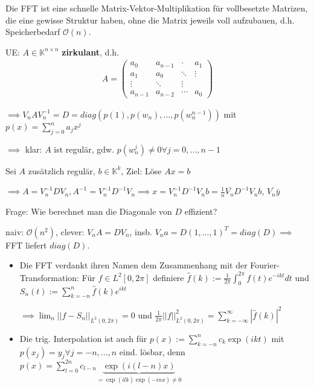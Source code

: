 \begin{remark}
	Die FFT ist eine schnelle Matrix-Vektor-Multiplikation für vollbesetzte Matrizen, die eine gewisse Struktur haben, ohne die Matrix jeweils voll aufzubauen, d.h. Speicherbedarf $\mathcal{O}(n)$.
\end{remark}

UE: $A \in \mathbb{K}^{n \times n}$ \textbf{zirkulant}, d.h.
\begin{align*}
	A = \left(\begin{matrix}
		a_0 & a_{n-1} & \cdot & a_1\\
		a_1 & a_0 & \ddots & \vdots\\
		\vdots & \ddots & \vdots\\
		a_{n-1} & a_{n-2} & \cdots & a_0
	\end{matrix}\right)
\end{align*}

$\implies V_n A V_n^{-1} = D = diag(p(1), p(w_n), ..., p(w_n^{n-1}))$ mit $p(x) = \sum_{j=0}^{n} a_j x^j$

$\implies$ klar: $A$ ist regulär, gdw. $p(w_n^j) \neq 0 \forall j=0, ..., n-1$

Sei $A$ zusätzlich regulär, $b \in \mathbb{K}^k$, Ziel: Löse $Ax=b$

$\implies A = V_n^{-1}DV_n, A^{-1} = V_n^{-1}D^{-1}V_n \implies x = V_n^{-1}D^{-1}V_nb = \frac{1}{n} \overline{V_n}D^{-1}V_nb$, $\overline{V_n\bar{y}}$

Frage: Wie berechnet man die Diagonale von $D$ effizient?

naiv: $\mathcal{O}(n^2)$, clever: $V_nA=DV_n$, insb. $V_na = D(1, ..., 1)^T = diag(D) \implies$ FFT liefert $diag(D)$.

\begin{remark}
	\begin{itemize}
		\item Die FFT verdankt ihren Namen dem Zusammenhang mit der Fourier-Transformation: Für $f \in L^2[0, 2\pi]$ definiere $\hat{f}(k) := \frac{1}{2\pi} \int_{0}^{2\pi}f(t)e^{-ikt}dt$ und $S_n(t) := \sum_{k=-n}^{n} \hat{f}(k) e^{ikt}$
		
		$\implies \lim_n ||f-S_n||_{L^2(0, 2\pi)} = 0$ und $\frac{1}{2\pi} ||f||_{L^2(0,2\pi)}^2 = \sum_{k=-\infty}^{\infty}|\hat{f}(k)|^2$
		
		\item Die trig. Interpolation ist auch für $p(x) := \sum_{k=-n}^{n} c_k \exp(ikt)$ mit $p(x_j) = y_j \forall j=-n, ..., n$ eind. lösbar, denn $p(x) = \sum_{l=0}^{2n} c_{l-n} \underbrace{\exp(i(l-n)x)}_{=\exp(ilk)\exp(-inx) \neq 0}$
	\end{itemize}
\end{remark}




